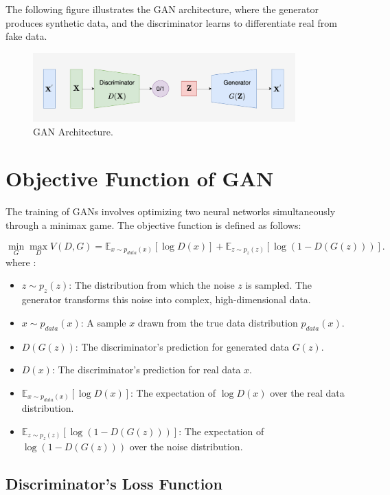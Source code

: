 The following figure illustrates the GAN architecture, where the generator produces synthetic data, and the discriminator learns to differentiate real from fake data.

\begin{figure}[H]
    \centering
    \includegraphics[width=0.9\textwidth]{./Images/GAN_structure.jpg}
    \caption{GAN Architecture.}
    \label{fig:GAN_structure}
\end{figure}


\section{Objective Function of GAN}

The training of GANs involves optimizing two neural networks simultaneously through a minimax game. The objective function is defined as follows:

\begin{equation}
    \min_{G} \max_{D} V(D, G) = \mathbb{E}_{x \sim p_{data}(x)} [\log D(x)] + \mathbb{E}_{z \sim p_{z}(z)} [\log(1 - D(G(z)))].
\end{equation}
where :
\begin{itemize}
    \item \(z \sim p_z(z)\): The distribution from which the noise \(z\) is sampled. The generator transforms this noise into complex, high-dimensional data.
    \item \(x \sim p_{data}(x)\): A sample \(x\) drawn from the true data distribution \(p_{data}(x)\).
    \item \(D(G(z))\): The discriminator's prediction for generated data \(G(z)\).
    \item \(D(x)\): The discriminator's prediction for real data \(x\).
    \item \(\mathbb{E}_{x \sim p_{data}(x)}[\log D(x)]\): The expectation of \(\log D(x)\) over the real data distribution.
    \item \(\mathbb{E}_{z \sim p_z(z)}[\log(1 - D(G(z)))]\): The expectation of \(\log(1 - D(G(z)))\) over the noise distribution.
\end{itemize}

\subsection{Discriminator's Loss Function}

